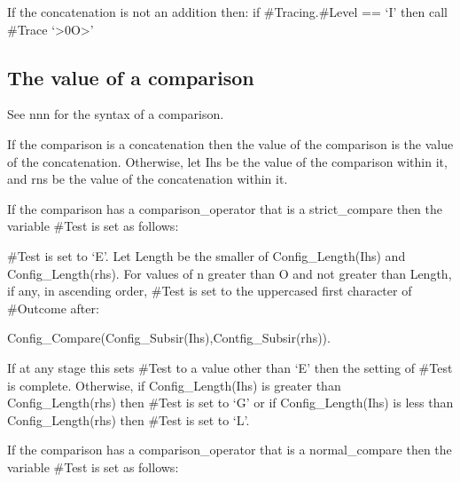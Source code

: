 If the concatenation is not an addition then: if \#Tracing.\#Level ==
`I' then call \#Trace `\textgreater0O\textgreater{}'

\hypertarget{the-value-of-a-comparison}{%
\subsection{The value of a comparison}\label{the-value-of-a-comparison}}

See nnn for the syntax of a comparison.

If the comparison is a concatenation then the value of the comparison is
the value of the concatenation. Otherwise, let Ihs be the value of the
comparison within it, and rns be the value of the concatenation within
it.

If the comparison has a comparison\_operator that is a strict\_compare
then the variable \#Test is set as follows:

\#Test is set to `E'. Let Length be the smaller of Config\_Length(Ihs)
and Config\_Length(rhs). For values of n greater than O and not greater
than Length, if any, in ascending order, \#Test is set to the uppercased
first character of \#Outcome after:

Config\_Compare(Config\_Subsir(Ihs),Contfig\_Subsir(rhs)).

If at any stage this sets \#Test to a value other than `E' then the
setting of \#Test is complete. Otherwise, if Config\_Length(Ihs) is
greater than Config\_Length(rhs) then \#Test is set to `G' or if
Config\_Length(Ihs) is less than Config\_Length(rhs) then \#Test is set
to `L'.

If the comparison has a comparison\_operator that is a normal\_compare
then the variable \#Test is set as follows:

